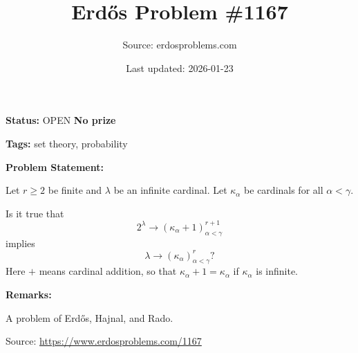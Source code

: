 \documentclass{article}
\title{Erd\H{o}s Problem \#1167}
\date{Last updated: 2026-01-23}
\author{Source: erdosproblems.com}
\begin{document}
\maketitle

\noindent\textbf{Status:} OPEN \quad \textbf{No prize}

\noindent\textbf{Tags:} set theory, probability

\medskip
\noindent\textbf{Problem Statement:}

Let $r\geq 2$ be finite and $\lambda$ be an infinite cardinal. Let $\kappa_\alpha$ be cardinals for all $\alpha<\gamma$. 

Is it true that\[2^\lambda \to (\kappa_\alpha+1)_{\alpha<\gamma}^{r+1}\]implies\[\lambda \to (\kappa_\alpha)_{\alpha<\gamma}^{r}?\]Here $+$ means cardinal addition, so that $\kappa_\alpha+1=\kappa_\alpha$ if $\kappa_\alpha$ is infinite.

\bigskip
\noindent\textbf{Remarks:}

A problem of Erd\H{o}s, Hajnal, and Rado.

\bigskip
\noindent\small{Source: \url{https://www.erdosproblems.com/1167}}
\end{document}
